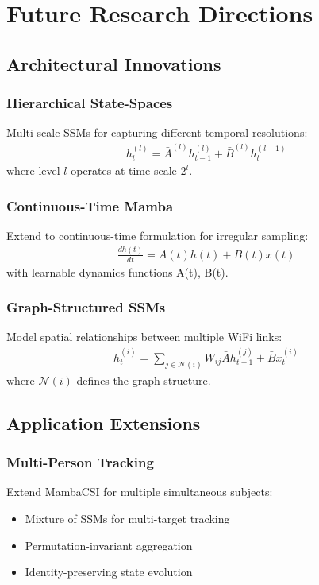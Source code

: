\documentclass[journal]{IEEEtran}
\begin{document}
\section{Future Research Directions}

\subsection{Architectural Innovations}

\subsubsection{Hierarchical State-Spaces}
Multi-scale SSMs for capturing different temporal resolutions:
\begin{align}
h_t^{(l)} = \bar{A}^{(l)} h_{t-1}^{(l)} + \bar{B}^{(l)} h_t^{(l-1)}
\end{align}
where level $l$ operates at time scale $2^l$.

\subsubsection{Continuous-Time Mamba}
Extend to continuous-time formulation for irregular sampling:
\begin{align}
\frac{dh(t)}{dt} = A(t)h(t) + B(t)x(t)
\end{align}
with learnable dynamics functions A(t), B(t).

\subsubsection{Graph-Structured SSMs}
Model spatial relationships between multiple WiFi links:
\begin{align}
h_t^{(i)} = \sum_{j \in \mathcal{N}(i)} W_{ij} \bar{A} h_{t-1}^{(j)} + \bar{B} x_t^{(i)}
\end{align}
where $\mathcal{N}(i)$ defines the graph structure.

\subsection{Application Extensions}

\subsubsection{Multi-Person Tracking}
Extend MambaCSI for multiple simultaneous subjects:
\begin{itemize}
\item Mixture of SSMs for multi-target tracking
\item Permutation-invariant aggregation
\item Identity-preserving state evolution
\end{itemize}
\end{document}
